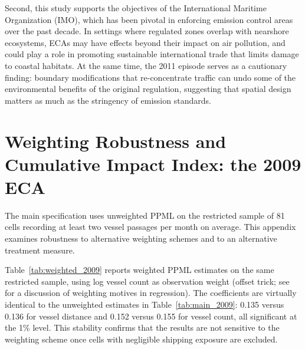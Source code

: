 \documentclass[12pt]{article}
\begin{document}
Second, this study supports the objectives of the International Maritime Organization (IMO), which has been pivotal in enforcing emission control areas over the past decade. In settings where regulated zones overlap with nearshore ecosystems, ECAs may have effects beyond their impact on air pollution, and could play a role in promoting sustainable international trade that limits damage to coastal habitats. At the same time, the 2011 episode serves as a cautionary finding: boundary modifications that re-concentrate traffic can undo some of the environmental benefits of the original regulation, suggesting that spatial design matters as much as the stringency of emission standards.

\printbibliography
\newpage

\appendix


\section{Weighting Robustness and Cumulative Impact Index: the 2009 ECA}\label{appendix_weighted}

The main specification uses unweighted PPML on the restricted sample of 81 cells recording at least two vessel passages per month on average. This appendix examines robustness to alternative weighting schemes and to an alternative treatment measure.

Table~\ref{tab:weighted_2009} reports weighted PPML estimates on the same restricted sample, using log vessel count as observation weight (offset trick; see \citealp{Solon2015} for a discussion of weighting motives in regression). The coefficients are virtually identical to the unweighted estimates in Table~\ref{tab:main_2009}: 0.135 versus 0.136 for vessel distance and 0.152 versus 0.155 for vessel count, all significant at the 1\% level. This stability confirms that the results are not sensitive to the weighting scheme once cells with negligible shipping exposure are excluded.
\end{document}

